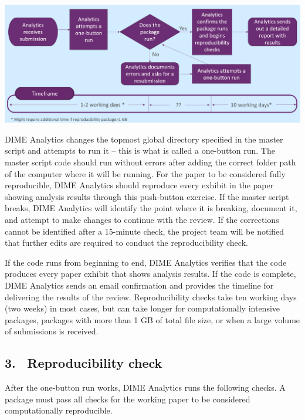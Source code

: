 \begin{fullwidth}
	\bigskip

	\begin{center}
		\includegraphics[width=0.9\linewidth]{../img/rep-checks-timeline.png}
	\end{center}

	\bigskip

	DIME Analytics changes the topmost global directory specified in the master script and attempts to run it – this is what is called a one-button run. The master script code should run without errors after adding the correct folder path of the computer where it will be running. For the paper to be considered fully reproducible, DIME Analytics should reproduce every exhibit in the paper showing analysis results through this push-button exercise. If the master script breaks, DIME Analytics will identify the point where it is breaking, document it, and attempt to make changes to continue with the review. If the corrections cannot be identified after a 15-minute check, the project team will be notified that further edits are required to conduct the reproducibility check.

	If the code runs from beginning to end, DIME Analytics verifies that the code produces every paper exhibit that shows analysis results. If the code is complete, DIME Analytics sends an email confirmation and provides the timeline for delivering the results of the review. Reproducibility checks take ten working days (two weeks) in most cases, but can take longer for computationally intensive packages, packages with more than 1 GB of total file size, or when a large volume of submissions is received.

	\subsection{3. \, Reproducibility check}

	After the one-button run works, DIME Analytics runs the following checks. A package must pass all checks for the working paper to be considered computationally reproducible. 


\end{fullwidth}
